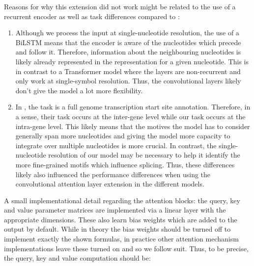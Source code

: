 Reasons for why this extension did not work might be related to the use of a recurrent encoder as well as task differences compared to \cite{ghentransformers}:
\begin{enumerate}
	\item Although we process the input at single-nucleotide resolution, the use of a BiLSTM means that the encoder is aware of the nucleotides which precede and follow it. Therefore, information about the neighbouring nucleotides is likely already represented in the representation for a given nucleotide. This is in contrast to a Transformer model where the layers are non-recurrent and only work at single-symbol resolution. Thus, the convolutional layers likely don't give the model a lot more flexibility.
	\item In \cite{ghentransformers}, the task is a full genome transcription start site annotation. Therefore, in a sense, their task occurs at the inter-gene level while our task occurs at the intra-gene level. This likely means that the motives the model has to consider generally span more nucleotides and giving the model more capacity to integrate over multiple nucleotides is more crucial. In contrast, the single-nucleotide resolution of our model may be necessary to help it identify the more fine-grained motifs which influence splicing. Thus, these differences likely also influenced the performance differences when using the convolutional attention layer extension in the different models.
\end{enumerate}


A small implementational detail regarding the attention blocks: the query, key and value parameter matrices are implemented via a linear layer with the appropriate dimensions. These also learn bias weights which are added to the output by default. While in theory the bias weights should be turned off to implement exactly the shown formulas, in practice other attention mechanism implementations leave these turned on \cite{annotatedtransformer} and so we follow suit. Thus, to be precise, the query, key and value computation should be:

